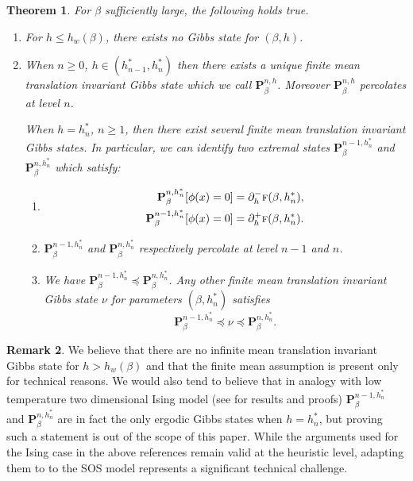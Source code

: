 \documentclass[JEP,XML,SOM,Unicode, NoFloatCountersInSection]{cedram}
\newenvironment{enumeratei}
{\bgroup\def\theenumi{\roman{enumi}}\def\theenumii{\Alph{enumii}}\begin{enumerate}}
{\end{enumerate}\egroup}
\numberwithin{equation}{section}
\theoremstyle{plain}
\newtheorem{theorem}{Theorem}[section]
\theoremstyle{definition}
\newtheorem{rem}[theorem]{Remark}
\newcommand{\bP}{{\ensuremath{\mathbf P}} }
\newcommand{\gb}{\beta}
\newcommand{\tf}{\textsc{f}}
\begin{document}
\begin{theorem}\label{Gibbs}
For $\gb$ sufficiently large, the following holds true.
\begin{enumeratei}
\item
For $h\le h_w(\gb)$, there exists no Gibbs state for $(\gb,h)$.
\item
When $n\ge 0$, $h\in (h^*_{n-1},h^*_{n})$ then there exists a unique finite mean translation invariant Gibbs state
which we call $\bP^{n,h}_{\gb}$.
Moreover $\bP^{n,h}_{\gb}$ percolates at level $n$.

When $h=h^*_n$, $n\ge 1$, then there exist several finite mean translation invariant Gibbs states.
In particular, we can identify two extremal states $\bP^{n-1,h^*_n}_{\gb}$ and $\bP^{n,h^*_n}_{\gb}$ which satisfy:
\begin{enumeratei}
\item\mbox{}\vspace*{-10pt}
\begin{equation}\label{variousgibbs}
\begin{split}
\bP^{n,h^*_n}_{\gb}[\phi(x)=0]&= \partial^-_h\tf(\gb,h^*_n), \\
\bP^{n-1,h^*_n}_{\gb}[\phi(x)=0]&= \partial^+_h\tf(\gb,h^*_n).
\end{split}
\end{equation}
\item
$\bP^{n-1,h^*_n}_{\gb}$ and $\bP^{n,h^*_n}_{\gb}$ respectively percolate at level $n-1$ and $n$.
\item
We have $\bP^{n-1,h^*_n}_{\gb}\preccurlyeq \bP^{n,h^*_n}_{\gb}$. Any other finite mean translation invariant Gibbs state $\nu$
for parameters $(\gb,h^*_n)$ satisfies
\begin{equation}\label{ssanduba}
\bP^{n-1,h^*_n}_{\gb}\preccurlyeq \nu \preccurlyeq \bP^{n,h^*_n}_{\gb}.
\end{equation}
\end{enumeratei}
\end{enumeratei}
\end{theorem}

\begin{rem}
We believe that there are no infinite mean translation invariant Gibbs state for $h>h_w(\gb)$ and that the finite mean assumption is present only for technical reasons.
We would also tend to believe that in analogy with low temperature two dimensional Ising model (see \cite{cf:A, cf:CoV, cf:H} for results and proofs)
$\bP^{n-1,h^*_n}_{\gb}$ and $\bP^{n,h^*_n}_{\gb}$ are in fact the only
ergodic Gibbs states when $h=h^*_n$, but proving such a statement is out of the scope of this paper. While the arguments used for the Ising case in the above references remain valid at the heuristic level, adapting them to to the SOS model represents a significant technical challenge.
\end{rem}
\end{document}
